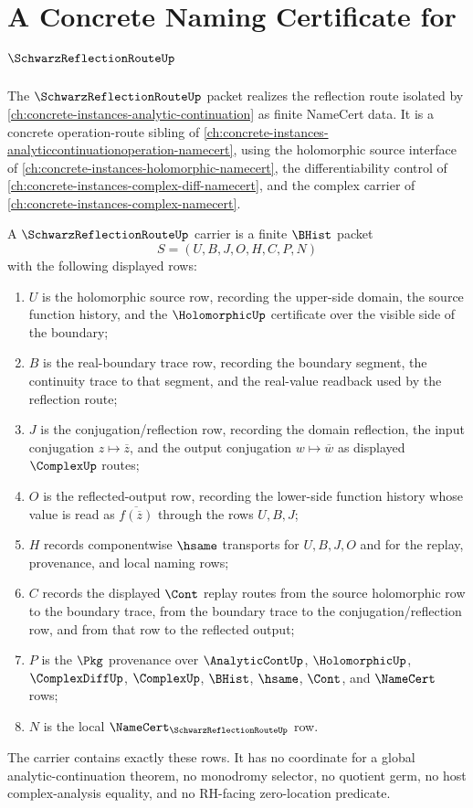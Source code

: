 \chapter{A Concrete Naming Certificate for $\SchwarzReflectionRouteUp$}
\label{ch:concrete-instances-schwarz-reflection-route-namecert}

The $\SchwarzReflectionRouteUp$ packet realizes the reflection route isolated by \autoref{ch:concrete-instances-analytic-continuation} as finite NameCert data. It is a concrete operation-route sibling of \autoref{ch:concrete-instances-analyticcontinuationoperation-namecert}, using the holomorphic source interface of \autoref{ch:concrete-instances-holomorphic-namecert}, the differentiability control of \autoref{ch:concrete-instances-complex-diff-namecert}, and the complex carrier of \autoref{ch:concrete-instances-complex-namecert}.

\begin{definition}
\label{def:schwarz-reflection-route-carrier}
A $\SchwarzReflectionRouteUp$ carrier is a finite $\BHist$ packet
$$
S=(U,B,J,O,H,C,P,N)
$$
with the following displayed rows:
\begin{enumerate}
\item $U$ is the holomorphic source row, recording the upper-side domain, the source function history, and the $\HolomorphicUp$ certificate over the visible side of the boundary;
\item $B$ is the real-boundary trace row, recording the boundary segment, the continuity trace to that segment, and the real-value readback used by the reflection route;
\item $J$ is the conjugation/reflection row, recording the domain reflection, the input conjugation $z\mapsto \overline{z}$, and the output conjugation $w\mapsto \overline{w}$ as displayed $\ComplexUp$ routes;
\item $O$ is the reflected-output row, recording the lower-side function history whose value is read as $\overline{f(\overline{z})}$ through the rows $U,B,J$;
\item $H$ records componentwise $\hsame$ transports for $U,B,J,O$ and for the replay, provenance, and local naming rows;
\item $C$ records the displayed $\Cont$ replay routes from the source holomorphic row to the boundary trace, from the boundary trace to the conjugation/reflection row, and from that row to the reflected output;
\item $P$ is the $\Pkg$ provenance over $\AnalyticContUp$, $\HolomorphicUp$, $\ComplexDiffUp$, $\ComplexUp$, $\BHist$, $\hsame$, $\Cont$, and $\NameCert$ rows;
\item $N$ is the local $\NameCert_{\SchwarzReflectionRouteUp}$ row.
\end{enumerate}
The carrier contains exactly these rows. It has no coordinate for a global analytic-continuation theorem, no monodromy selector, no quotient germ, no host complex-analysis equality, and no RH-facing zero-location predicate.
\end{definition}

